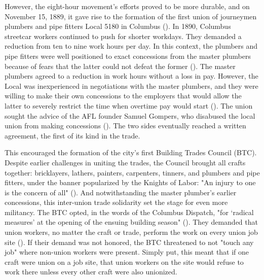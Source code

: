 \documentclass[12pt]{article}
\begin{document}
However, the eight-hour movement’s efforts proved to be more durable, and on November 15, 1889, it gave rise to the formation of the first union of journeymen plumbers and pipe fitters Local 5180 in Columbus (\cite[45]{schneirovPrideSolidarityHistory1993}). In 1890, Columbus streetcar workers continued to push for shorter workdays. They demanded a reduction from ten to nine work hours per day. In this context, the plumbers and pipe fitters were well positioned to exact concessions from the master plumbers because of fears that the latter could not defeat the former (\citeyear[45–46]{schneirovPrideSolidarityHistory1993}). The master plumbers agreed to a reduction in work hours without a loss in pay. However, the Local was inexperienced in negotiations with the master plumbers, and they were willing to make their own concessions to the employers that would allow the latter to severely restrict the time when overtime pay would start (\citeyear[46–47]{schneirovPrideSolidarityHistory1993}). The union sought the advice of the AFL founder Samuel Gompers, who disabused the local union from making concessions (\citeyear[46–47]{schneirovPrideSolidarityHistory1993}). The two sides eventually reached a written agreement, the first of its kind in the trade. 

This encouraged the formation of the city’s first Building Trades Council (BTC). Despite earlier challenges in uniting the trades, the Council brought all crafts together: bricklayers, lathers, painters, carpenters, tinners, and plumbers and pipe fitters, under the banner popularized by the Knights of Labor: "An injury to one is the concern of all" (\cite[47]{schneirovPrideSolidarityHistory1993}). And notwithstanding the master plumber’s earlier concessions, this inter-union trade solidarity set the stage for even more militancy. The BTC opted, in the words of the Columbus Dispatch, "for ‘radical measures’ at the opening of the ensuing building season" (\citeyear[47]{schneirovPrideSolidarityHistory1993}). They demanded that union workers, no matter the craft or trade, perform the work on every union job site (\citeyear[47]{schneirovPrideSolidarityHistory1993}). If their demand was not honored, the BTC threatened to not "touch any job" where non-union workers were present. Simply put, this meant that if one craft were union on a job site, that union workers on the site would refuse to work there unless every other craft were also unionized.
\end{document}
